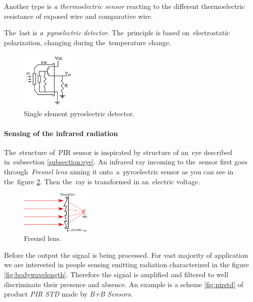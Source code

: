 Another type is {\it a thermoelectric sensor} reacting to the different thermoelectric resistance of
exposed wire and comparative wire.

The~last is {\it a~pyroelectric detector}. The~principle is based on~electrostatic polarization,
changing during the~temperature change. \cite{DetectorsBook}

\begin{figure}[h!]
\begin{center}
\includegraphics[width=0.25\textwidth]{obrazky-figures/pirscheme.png}
\caption{Single element pyroelectric detector.\cite{an2105}\label{fig:pir}}
\end{center}    
\end{figure}


\paragraph{Sensing of the infrared radiation}
The~structure of~PIR sensor is inspirated by structure of an~eye described in~subsection \ref{subsection:eye}.
An infrared ray incoming to the~sensor first goes through~{\it Fresnel lens} aiming it onto~a~pyroelectric sensor
as you can see in the~figure \ref{fig:fresnellens}. Then the~ray is transformed in an~electric voltage.

\begin{figure}[h!]
\begin{center}
\includegraphics[width=0.3\textwidth]{obrazky-figures/fresnellens.png}
\caption{Fresnel lens.\label{fig:fresnellens}}
\end{center}
\end{figure}

Before the output the signal is being processed. For vast majority of application we are interested in
people sensing emitting radiation characterized in the figure \ref{fig:bodywavelength}.
Therefore the signal is amplified and filtered to well discriminate their presence and absence.
An example is a scheme \ref{fig:pirstd} of product {\it PIR STD} made by {\it B+B Sensors}.

